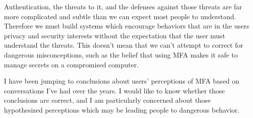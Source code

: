 \documentclass{soups}
\begin{document}
Authentication, the threats to it, and the defenses against those threats are far more complicated and subtle than we can expect most people to understand.
Therefore we must build systems which encourage behaviors that are in the users
privacy and security interests without the expectation that the user must understand the threats.
This doesn't mean that we can't attempt to correct for dangerous misconceptions,
such as the belief that using MFA makes it safe to manage secrets on a compromised computer.

I have been jumping to conclusions about users' perceptions of MFA based on 
conversations I've had over the years.
I would like to know whether those conclusions are correct,
and I am particularly concerned about those hypothesized perceptions which may be leading
people to dangerous behavior.

%
%
\printbibliography[title={REFERENCES},heading=bibnumbered]
\end{document}

